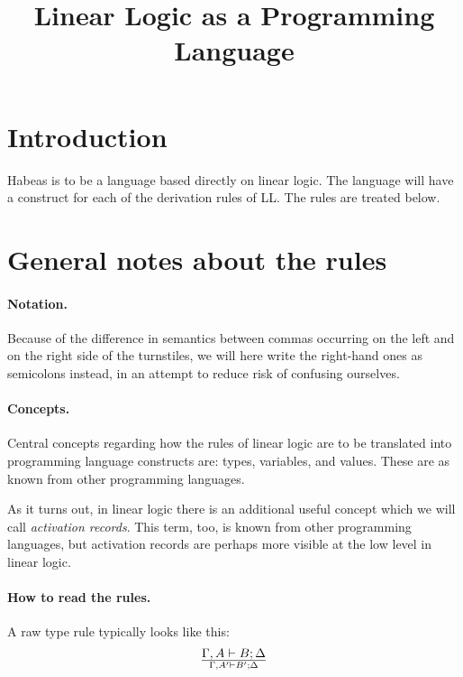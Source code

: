 \documentclass[a4paper]{article}
\title{Linear Logic as a Programming Language}
\begin{document}
\maketitle

\section{Introduction}

Habeas is to be a language based directly on linear logic.
The language will have a construct for each of the derivation rules of LL.
The rules are treated below.

\section{General notes about the rules}

\paragraph{Notation.}
Because of the difference in semantics between commas occurring on the
left and on the right side of the turnstiles, we will here write the
right-hand ones as semicolons instead, in an attempt to reduce risk of
confusing ourselves.

\paragraph{Concepts.} Central concepts regarding how the rules of
linear logic are to be translated into programming language constructs
are: types, variables, and values. These are as known from other
programming languages.

As it turns out, in linear logic there is an additional useful concept
which we will call \emph{activation records}.  This term, too, is
known from other programming languages, but activation records are
perhaps more visible at the low level in linear logic.


\paragraph{How to read the rules.} A raw type rule typically looks like this:
$$
{\Gamma,A \vdash B;\Delta}\over{\Gamma,A' \vdash B';\Delta}
$$
\end{document}
